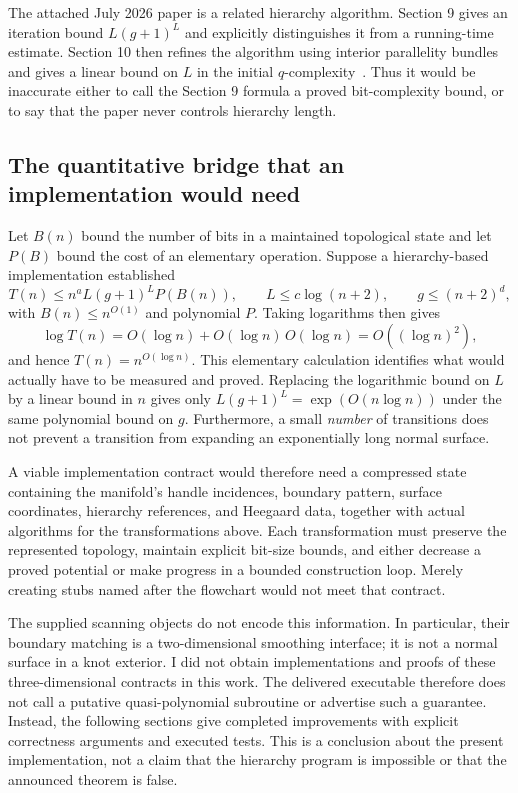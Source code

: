 \documentclass[11pt]{article}
\theoremstyle{definition}\newtheorem{definition}[theorem]{Definition}
\theoremstyle{remark}\newtheorem{remark}[theorem]{Remark}
\begin{document}
The attached July 2026 paper is a related hierarchy algorithm. Section 9 gives
an iteration bound $L(g+1)^L$ and explicitly distinguishes it from a
running-time estimate. Section 10 then refines the algorithm using interior
parallelity bundles and gives a linear bound on $L$ in the initial
$q$-complexity~\cite{L2026}. Thus it would be inaccurate either to call the
Section 9 formula a proved bit-complexity bound, or to say that the paper never
controls hierarchy length.

\subsection{The quantitative bridge that an implementation would need}
Let $B(n)$ bound the number of bits in a maintained topological state and let
$P(B)$ bound the cost of an elementary operation. Suppose a hierarchy-based
implementation established
\begin{equation}\label{eq:hierbound}
 T(n)\leq n^a L(g+1)^L P(B(n)),\qquad
 L\leq c\log(n+2),\qquad g\leq(n+2)^d,
\end{equation}
with $B(n)\leq n^{O(1)}$ and polynomial $P$. Taking logarithms then gives
\[
 \log T(n)=O(\log n)+O(\log n)\,O(\log n)=O((\log n)^2),
\]
and hence $T(n)=n^{O(\log n)}$. This elementary calculation identifies what
would actually have to be measured and proved. Replacing the logarithmic bound
on $L$ by a linear bound in $n$ gives only
$L(g+1)^L=\exp(O(n\log n))$ under the same polynomial bound on $g$.
Furthermore, a small \emph{number} of transitions does not prevent a transition
from expanding an exponentially long normal surface.

A viable implementation contract would therefore need a compressed state
containing the manifold's handle incidences, boundary pattern, surface
coordinates, hierarchy references, and Heegaard data, together with actual
algorithms for the transformations above. Each transformation must preserve the
represented topology, maintain explicit bit-size bounds, and either decrease
a proved potential or make progress in a bounded construction loop. Merely
creating stubs named after the flowchart would not meet that contract.

The supplied scanning objects do not encode this information. In particular,
their boundary matching is a two-dimensional smoothing interface; it is not a
normal surface in a knot exterior. I did not obtain implementations and proofs
of these three-dimensional contracts in this work. The delivered executable
therefore does not call a putative quasi-polynomial subroutine or advertise
such a guarantee. Instead, the following sections give completed improvements
with explicit correctness arguments and executed tests. This is a conclusion
about the present implementation, not a claim that the hierarchy program is
impossible or that the announced theorem is false.
\end{document}
